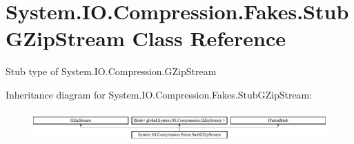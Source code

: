 \hypertarget{class_system_1_1_i_o_1_1_compression_1_1_fakes_1_1_stub_g_zip_stream}{\section{System.\-I\-O.\-Compression.\-Fakes.\-Stub\-G\-Zip\-Stream Class Reference}
\label{class_system_1_1_i_o_1_1_compression_1_1_fakes_1_1_stub_g_zip_stream}
}


Stub type of System.\-I\-O.\-Compression.\-G\-Zip\-Stream 


Inheritance diagram for System.\-I\-O.\-Compression.\-Fakes.\-Stub\-G\-Zip\-Stream\-:\begin{figure}[H]
\begin{center}
\leavevmode
\includegraphics[height=1.185185cm]{class_system_1_1_i_o_1_1_compression_1_1_fakes_1_1_stub_g_zip_stream}
\end{center}
\end{figure}

